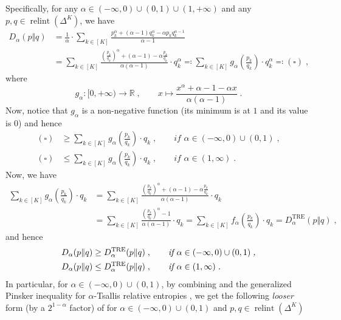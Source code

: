 \documentclass[11pt,oneside,a4paper]{article}
\newcommand{\R}{\mathbb{R}}
\newcommand{\lrb}[1]{\left(#1\right)}
\theoremstyle{plain}
\theoremstyle{definition}
\theoremstyle{remark}
\newcommand{\simplex}[1]{\Delta^{#1}}
\DeclareMathOperator*{\relint}{relint}
\begin{document}
{Specifically, for any $\alpha \in (-\infty,0)\cup (0,1) \cup (1,+\infty)$ and any $p,q \in \relint(\simplex{K})$, we have
\begin{align*}
    D_\alpha(p \Vert q)
&=
    \frac{1}{\alpha} \cdot \sum_{k \in [K]} \frac{p_k^\alpha + (\alpha-1)q_k^\alpha-\alpha p_kq_k^{\alpha-1}}{\alpha-1}
\\
&=
    \sum_{k \in [K]} \frac{\lrb{\frac{p_k}{q_k}}^\alpha + (\alpha-1)-\alpha\frac{p_k}{q_k}}{\alpha(\alpha-1)} \cdot q_k^{\alpha}
\eqqcolon
    \sum_{k \in [K]} g_\alpha \lrb{\frac{p_k}{q_k}}\cdot q_k^{\alpha}
\eqqcolon
    (\square)\;,
\end{align*}
where
\[
    g_\alpha \colon [0,+\infty) \to \R\;, \qquad x \mapsto \frac{x^\alpha+ \alpha-1 -\alpha x }{\alpha(\alpha-1)}\;.
\]
Now, notice that $g_\alpha$ is a non-negative function (its minimum is at $1$ and its value is $0$) and hence
\begin{align*}
    (\square)
&\ge
    \sum_{k \in [K]} g_\alpha \lrb{\frac{p_k}{q_k}}\cdot q_k\;, \qquad \textit{if $\alpha \in (-\infty,0)\cup(0,1)$}\;,
\\
    (\square)
&\le
    \sum_{k \in [K]} g_\alpha \lrb{\frac{p_k}{q_k}}\cdot q_k\;, \qquad \textit{if $\alpha \in (1,\infty)$}\;.
\end{align*}
Now, we have
\begin{align*}  
    \sum_{k \in [K]} g_\alpha \lrb{\frac{p_k}{q_k}}\cdot q_k
&=
    \sum_{k \in [K]} \frac{\lrb{\frac{p_k}{q_k}}^\alpha + (\alpha-1)-\alpha\frac{p_k}{q_k}}{\alpha(\alpha-1)}\cdot q_k
\\
&=
    \sum_{k \in [K]} \frac{\lrb{\frac{p_k}{q_k}}^\alpha -1}{\alpha(\alpha-1)} \cdot q_k
=
    \sum_{k \in [K]} f_\alpha \lrb{\frac{p_k}{q_k}}\cdot q_k
=
    D^{\textrm{TRE}}_\alpha(p \Vert q) \;,
\end{align*}
and hence
\begin{align}
    \label{eq:bregman_vs_relative_a<1}
    D_\alpha(p \Vert q)
    &\ge
    D^{\textrm{TRE}}_\alpha(p \Vert q)\;, \qquad \textit{if $\alpha \in (-\infty,0)\cup (0,1)$\;,}
    \\
    \label{eq:bregman_vs_relative_a>1}
    D_\alpha(p \Vert q)
    &\le
    D^{\textrm{TRE}}_\alpha(p \Vert q)\;, \qquad \textit{if $\alpha \in (1,\infty)$\;.}
\end{align}
In particular, for $\alpha \in (-\infty,0)\cup(0,1)$, by combining  and the generalized Pinsker inequality for $\alpha$-Tsallis relative entropies , we get the following \emph{looser} form (by a $2^{1-\alpha}$ factor) of  for $\alpha \in (-\infty,0)\cup(0,1)$ and $p,q \in \relint(\simplex{K})$ 
}
\end{document}

